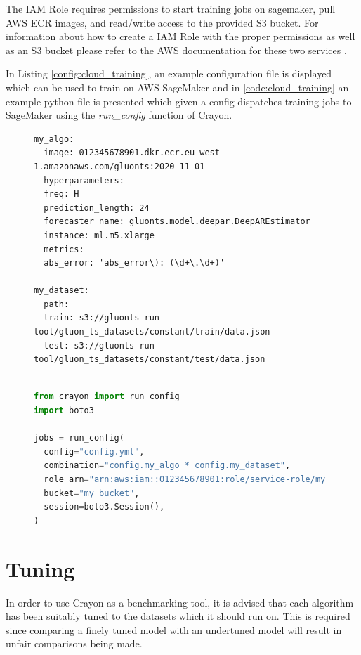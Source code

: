 The IAM Role requires permissions to start training jobs on sagemaker, pull AWS ECR images, and read/write access to the provided S3 bucket. For information about how to create a IAM Role with the proper permissions as well as an S3 bucket please refer to the AWS documentation for these two services \cite{iam_website,s3_website}.

In Listing \ref{config:cloud_training}, an example configuration file is displayed which can be used to train on AWS SageMaker and in \ref{code:cloud_training} an example python file is presented which given a config dispatches training jobs to SageMaker using the \textit{run\_config} function of Crayon.

\begin{figure}[h]
  \begin{lstlisting}[label={config:cloud_training}, caption={Config file for running training jobs on SageMaker.}]
my_algo:
  image: 012345678901.dkr.ecr.eu-west-1.amazonaws.com/gluonts:2020-11-01
  hyperparameters:
  freq: H
  prediction_length: 24
  forecaster_name: gluonts.model.deepar.DeepAREstimator 
  instance: ml.m5.xlarge 
  metrics:
  abs_error: 'abs_error\): (\d+\.\d+)'

my_dataset:
  path:
  train: s3://gluonts-run-tool/gluon_ts_datasets/constant/train/data.json
  test: s3://gluonts-run-tool/gluon_ts_datasets/constant/test/data.json
      
  \end{lstlisting}
  \begin{lstlisting}[language=Python, label={code:cloud_training}, caption={Code for running training jobs on AWS SageMaker using Crayon}]
from crayon import run_config
import boto3

jobs = run_config(
  config="config.yml",
  combination="config.my_algo * config.my_dataset",
  role_arn="arn:aws:iam::012345678901:role/service-role/my_role",
  bucket="my_bucket",
  session=boto3.Session(),
)
    \end{lstlisting}

\end{figure}

\section{Tuning}
In order to use Crayon as a benchmarking tool, it is advised that each algorithm has been suitably tuned to the datasets which it should run on. This is required since comparing a finely tuned model with an undertuned model will result in unfair comparisons being made.

